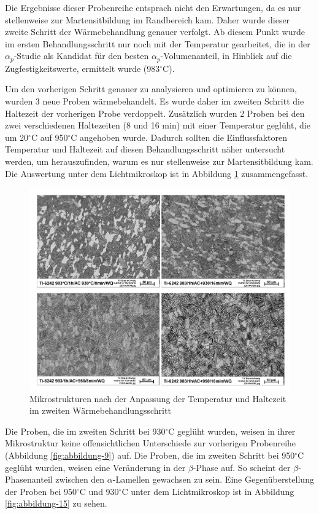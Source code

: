 Die Ergebnisse dieser Probenreihe entsprach nicht den Erwartungen, da es nur stellenweise zur Martensitbildung im Randbereich kam. Daher wurde dieser zweite Schritt der Wärmebehandlung genauer verfolgt. Ab diesem Punkt wurde im ersten Behandlungsschritt nur noch mit der Temperatur gearbeitet, die in der $\alpha_p$-Studie als Kandidat für den besten $\alpha_p$-Volumenanteil, in Hinblick auf die Zugfestigkeitswerte, ermittelt wurde (983$^\circ$C). 

Um den vorherigen Schritt genauer zu analysieren und optimieren zu können, wurden 3 neue Proben wärmebehandelt. Es wurde daher im zweiten Schritt die Haltezeit der vorherigen Probe verdoppelt. Zusätzlich wurden 2 Proben bei den zwei verschiedenen Haltezeiten (8 und 16 min) mit einer Temperatur geglüht, die um 20$^\circ$C auf 950$^\circ$C angehoben wurde. Dadurch sollten die Einflussfaktoren Temperatur und Haltezeit auf diesen Behandlungsschritt näher untersucht werden, um herauszufinden, warum es nur stellenweise zur Martensitbildung kam. Die Auswertung unter dem Lichtmikroskop ist in Abbildung \ref{fig:abbildung-14} zusammengefasst. 

\begin{figure}
	\centering
	\includegraphics[width=0.9\linewidth]{./Bilder/Abbildung 14.png}
	\caption[Abbildung 14]{Mikrostrukturen nach der Anpassung der Temperatur und Haltezeit im zweiten Wärmebehandlungsschritt}
	\label{fig:abbildung-14}
\end{figure}

Die Proben, die im zweiten Schritt bei 930$^\circ$C geglüht wurden, weisen in ihrer Mikrostruktur keine offensichtlichen Unterschiede zur vorherigen Probenreihe (Abbildung \ref{fig:abbildung-9}) auf. Die Proben, die im zweiten Schritt bei 950$^\circ$C geglüht wurden, weisen eine Veränderung in der $\beta$-Phase auf. So scheint der $\beta$-Phasenanteil zwischen den $\alpha$-Lamellen gewachsen zu sein. Eine Gegenüberstellung der Proben bei 950$^\circ$C und 930$^\circ$C unter dem Lichtmikroskop ist in Abbildung \ref{fig:abbildung-15} zu sehen.


